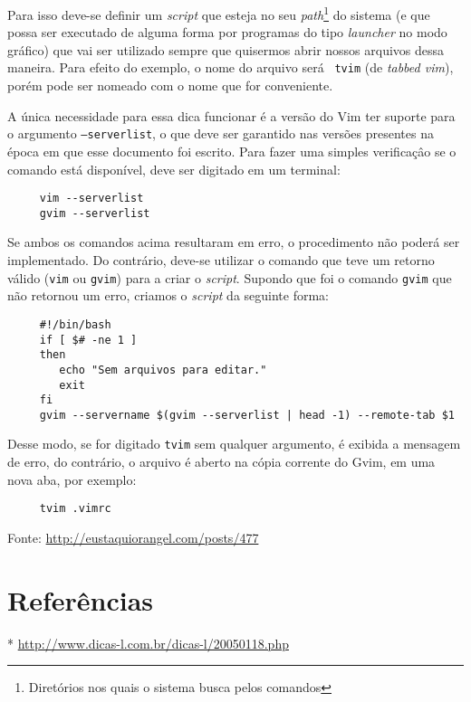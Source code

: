 Para isso deve-se definir um {\em script} que esteja no seu
{\em path}\footnote{Diretórios nos quais o sistema busca pelos comandos} do sistema
(e que possa ser executado de alguma forma por programas do tipo {\em launcher}
no modo gráfico) que vai ser utilizado sempre que quisermos abrir nossos
arquivos dessa maneira. Para efeito do exemplo, o nome do arquivo será {\tt
tvim} (de {\em tabbed vim}), porém pode ser nomeado com o nome que for
conveniente.

A única necessidade para essa dica funcionar é a versão do Vim ter suporte para
o argumento {\tt --serverlist}, o que deve ser garantido nas versões presentes
na época em que esse documento foi escrito. Para fazer uma simples verificaçâo
se o comando está disponível, deve ser digitado em um terminal:

\begin{verbatim}
     vim --serverlist
     gvim --serverlist
\end{verbatim}

Se ambos os comandos acima resultaram em erro, o procedimento não poderá ser
implementado. Do contrário, deve-se utilizar o comando que teve um retorno
válido ({\tt vim} ou {\tt gvim}) para a criar o {\em script}. Supondo que foi o
comando {\tt gvim} que não retornou um erro, criamos o {\em script} da seguinte
forma:

\begin{verbatim}
     #!/bin/bash
     if [ $# -ne 1 ]
     then
        echo "Sem arquivos para editar."
        exit
     fi
     gvim --servername $(gvim --serverlist | head -1) --remote-tab $1
\end{verbatim}

Desse modo, se for digitado {\tt tvim} sem qualquer argumento, é exibida a
mensagem de erro, do contrário, o arquivo é aberto na cópia corrente do Gvim,
em uma nova aba, por exemplo:

\begin{verbatim}
     tvim .vimrc
\end{verbatim}

Fonte: \url{http://eustaquiorangel.com/posts/477}

\section{Referências}
\label{Referências}
* \url{http://www.dicas-l.com.br/dicas-l/20050118.php}
